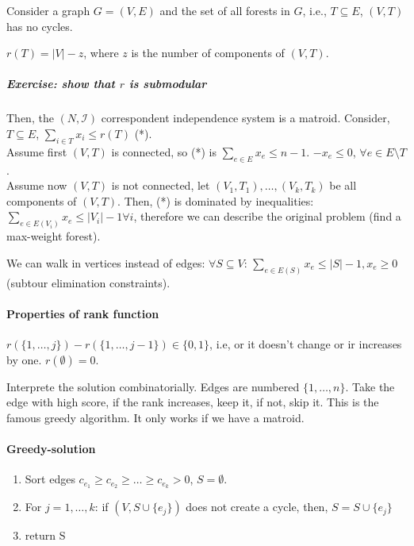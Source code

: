 \documentclass[main]{subfiles}
\begin{document}
Consider a graph $G=(V,E)$ and the set of all forests in $G$, i.e.,
$T \subseteq E$, $(V,T)$ has no cycles.

$r(T) = |V| - z$, where $z$ is the number of components of $(V,T)$.

\subparagraph{Exercise: show that $r$ is submodular}

Then, the $(N,\mathcal{I})$ correspondent independence system is a matroid.
Consider, $T \subseteq E$, $\sum_{i \in T} x_i \leq r(T)$ (*).\\
Assume first $(V,T)$ is connected, so (*) is $\sum_{e \in E} x_e \leq n-1$.
$-x_e \leq 0$, $\forall e \in E \setminus T$.\\
Assume now $(V,T)$ is not connected, let $(V_1, T_1), \dots, (V_k, T_k)$ be all
components of $(V,T)$. Then, (*) is dominated by inequalities:
$\sum_{e \in E(V_i)} x_e \leq |V_i| - 1 \forall i$, therefore we can describe
the original problem (find a max-weight forest).

We can walk in vertices instead of edges: $\forall S \subseteq V$:
$\sum_{e \in E(S)} x_e \leq |S| - 1, x_e \geq 0$ (subtour elimination
constraints).\\


\paragraph{Properties of rank function}
$r(\{1, \dots, j\}) - r(\{1, \dots, j-1\}) \in \{0,1\}$, i.e, or it doesn't
change or ir increases by one. $r(\emptyset) = 0$.

Interprete the solution combinatorially. Edges are numbered $\{1, \dots, n\}$.
Take the edge with high score, if the rank increases, keep it, if not, skip it.
This is the famous greedy algorithm. It only works if we have a matroid.

\paragraph{Greedy-solution}
\begin{enumerate}
\itemsep0em
\item Sort edges $c_{e_1} \geq c_{e_2} \geq \dots \geq c_{e_k} > 0$,
$S= \emptyset$.
\item For $j = 1, \dots, k$:
\subitem if $(V,S\cup \{e_j\})$ does not create a cycle, then, $S = S \cup
\{e_j\}$
\item return S
\end{enumerate}
\end{document}
